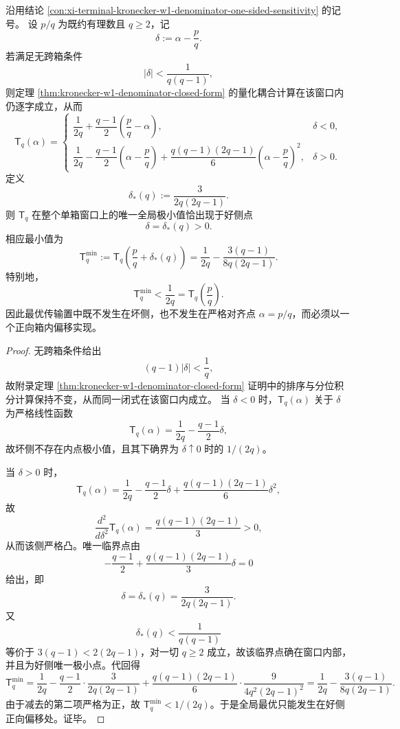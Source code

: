 \begin{theorem}\label{thm:xi-kronecker-w1-single-box-optimal-centering}
沿用结论 \ref{con:xi-terminal-kronecker-w1-denominator-one-sided-sensitivity} 的记号。
设 \(p/q\) 为既约有理数且 \(q\ge 2\)，记
\[
\delta:=\alpha-\frac pq.
\]
若满足无跨箱条件
\[
|\delta|<\frac{1}{q(q-1)},
\]
则定理 \ref{thm:kronecker-w1-denominator-closed-form} 的量化耦合计算在该窗口内仍逐字成立，从而
\[
\mathsf{T}_q(\alpha)=
\begin{cases}
\dfrac{1}{2q}+\dfrac{q-1}{2}\left(\dfrac pq-\alpha\right),& \delta<0,\\[2mm]
\dfrac{1}{2q}-\dfrac{q-1}{2}\left(\alpha-\dfrac pq\right)
+\dfrac{q(q-1)(2q-1)}{6}\left(\alpha-\dfrac pq\right)^2,& \delta>0.
\end{cases}
\]
定义
\[
\delta_\ast(q):=\frac{3}{2q(2q-1)}.
\]
则 \(\mathsf{T}_q\) 在整个单箱窗口上的唯一全局极小值恰出现于好侧点
\[
\delta=\delta_\ast(q)>0.
\]
相应最小值为
\[
\boxed{\;
\mathsf{T}_q^{\min}
:=
\mathsf{T}_q\!\left(\frac pq+\delta_\ast(q)\right)
=
\frac1{2q}-\frac{3(q-1)}{8q(2q-1)}.\;}
\]
特别地，
\[
\boxed{\;\mathsf{T}_q^{\min}<\frac1{2q}=\mathsf{T}_q\!\left(\frac pq\right).\;}
\]
因此最优传输置中既不发生在坏侧，也不发生在严格对齐点 \(\alpha=p/q\)，而必须以一个正向箱内偏移实现。
\end{theorem}
\begin{proof}
无跨箱条件给出
\[
(q-1)|\delta|<\frac1q,
\]
故附录定理 \ref{thm:kronecker-w1-denominator-closed-form} 证明中的排序与分位积分计算保持不变，从而同一闭式在该窗口内成立。
当 \(\delta<0\) 时，\(\mathsf{T}_q(\alpha)\) 关于 \(\delta\) 为严格线性函数
\[
\mathsf{T}_q(\alpha)=\frac1{2q}-\frac{q-1}{2}\delta,
\]
故坏侧不存在内点极小值，且其下确界为 \(\delta\uparrow 0\) 时的 \(1/(2q)\)。

当 \(\delta>0\) 时，
\[
\mathsf{T}_q(\alpha)
=
\frac1{2q}-\frac{q-1}{2}\delta
+\frac{q(q-1)(2q-1)}{6}\delta^2,
\]
故
\[
\frac{d^2}{d\delta^2}\mathsf{T}_q(\alpha)=\frac{q(q-1)(2q-1)}3>0,
\]
从而该侧严格凸。唯一临界点由
\[
-\frac{q-1}{2}+\frac{q(q-1)(2q-1)}{3}\delta=0
\]
给出，即
\[
\delta=\delta_\ast(q)=\frac{3}{2q(2q-1)}.
\]
又
\[
\delta_\ast(q)<\frac1{q(q-1)}
\]
等价于 \(3(q-1)<2(2q-1)\)，对一切 \(q\ge 2\) 成立，故该临界点确在窗口内部，并且为好侧唯一极小点。代回得
\[
\mathsf{T}_q^{\min}
=
\frac1{2q}
-\frac{q-1}{2}\cdot\frac{3}{2q(2q-1)}
+\frac{q(q-1)(2q-1)}{6}\cdot\frac{9}{4q^2(2q-1)^2}
=
\frac1{2q}-\frac{3(q-1)}{8q(2q-1)}.
\]
由于减去的第二项严格为正，故 \(\mathsf{T}_q^{\min}<1/(2q)\)。于是全局最优只能发生在好侧正向偏移处。证毕。
\end{proof}

\endinput
